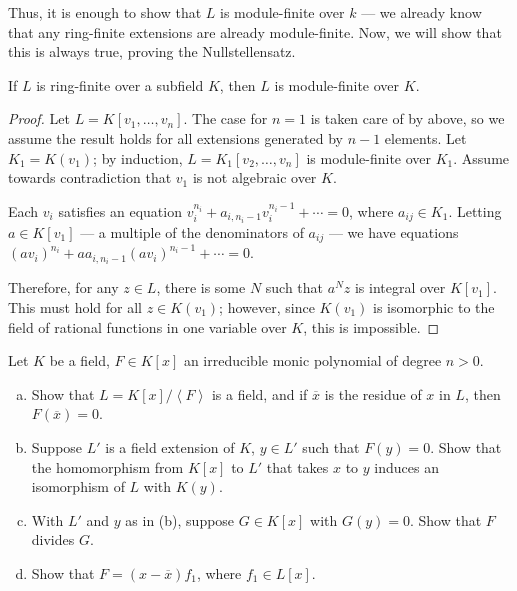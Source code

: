 \documentclass[10pt]{mypackage}
\begin{document}
Thus, it is enough to show that $L$ is module-finite over $k$ --- we already know that any ring-finite extensions are already module-finite. Now, we will show that this is always true, proving the Nullstellensatz.
\begin{proposition}
  If $L$ is ring-finite over a subfield $K$, then $L$ is module-finite over $K$.
\end{proposition}
\begin{proof}
  Let $L = K\left[ v_1,\dots,v_n \right]$. The case for $n = 1$ is taken care of by above, so we assume the result holds for all extensions generated by $n-1$ elements. Let $K_1 = K\left( v_1 \right)$; by induction, $L = K_1\left[ v_2,\dots,v_n \right]$ is module-finite over $K_1$. Assume towards contradiction that $v_1$ is not algebraic over $K$.\newline

  Each $v_i$ satisfies an equation $v_i^{n_i} + a_{i,n_i-1}v_i^{n_i-1} + \cdots = 0$, where $a_{ij}\in K_1$. Letting $a\in K\left[ v_1 \right]$ --- a multiple of the denominators of $a_{ij}$ --- we have equations $\left( av_i \right)^{n_i} + aa_{i,n_i-1}\left( av_i \right)^{n_i - 1} + \cdots = 0$.\newline

  Therefore, for any $z\in L$, there is some $N$ such that $a^N z$ is integral over $K\left[ v_1 \right]$. This must hold for all $z\in K\left( v_1 \right)$; however, since $K\left( v_1 \right)$ is isomorphic to the field of rational functions in one variable over $K$, this is impossible.
\end{proof}
\begin{exercise}[Exercise 1.51]
  Let $K$ be a field, $F\in K\left[ x \right]$ an irreducible monic polynomial of degree $n > 0$.
  \begin{enumerate}[(a)]
    \item Show that $L = K\left[ x \right]/\left\langle F \right\rangle$ is a field, and if $\overline{x}$ is the residue of $x$ in $L$, then $F\left( \overline{x} \right) = 0$.
    \item Suppose $L'$ is a field extension of $K$, $y\in L'$ such that $F(y) = 0$. Show that the homomorphism from $K\left[ x \right]$ to $L'$ that takes $x$ to $y$ induces an isomorphism of $L$ with $K\left( y \right)$.
    \item With $L'$ and $y$ as in (b), suppose $G\in K\left[ x \right]$ with $G(y) = 0$. Show that $F$ divides $G$.
    \item Show that $F = \left( x-\overline{x} \right)f_1$, where $f_1\in L\left[ x \right]$.
  \end{enumerate}
\end{exercise}
\end{document}
